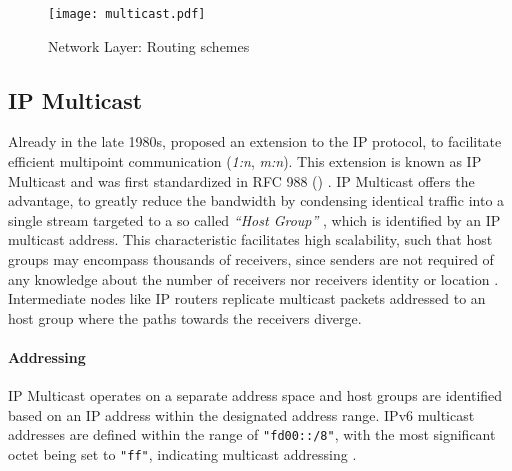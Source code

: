 
\begin{figure}[h]
    \begin{center}
        \texttt{[image: multicast.pdf]}
    \end{center}
    \caption{Network Layer: Routing schemes}
    \label{fig:multicast}
\end{figure}

\subsection{IP Multicast} %
\label{sub:IP Multicast}
Already in the late 1980s, \citeauthor{deering1990multicast}
    \cite{deering1990multicast} proposed an extension to the IP protocol, to
    facilitate efficient multipoint communication (\textit{1:n}, \textit{m:n}).
This extension is known as IP Multicast and was first standardized in RFC 988
    (\citeyear{rfc988_initmc}) \cite{rfc988_initmc}.
IP Multicast offers the advantage, to greatly reduce the bandwidth by condensing
    identical traffic into a single stream targeted to a so called
    \textit{``Host Group''} \cite{rfc1112_ip4mc}, which is identified by an IP
    multicast address.
This characteristic facilitates high scalability, such that host groups may
    encompass thousands of receivers, since senders are not required of any
    knowledge about the number of receivers nor receivers identity or location
    \cite{cisco_ipmc}.
Intermediate nodes like IP routers replicate multicast packets addressed to an
    host group where the paths towards the receivers diverge.

\paragraph{Addressing} %
\label{par:Addressing}
IP Multicast operates on a separate address space and host groups are
    identified based on an IP address within the designated address range.
IPv6 multicast addresses are defined within the range of \texttt{"fd00::/8"},
    with the most significant octet being set to \texttt{"ff"}, indicating
    multicast addressing \cite{rfc4291_ip6mc}.

